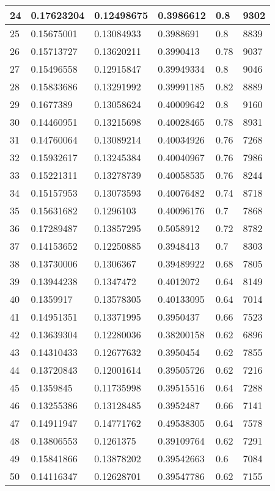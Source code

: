 \begin{longtable}{|l|l|l|l|l|l|}
24 & 0.17623204 & 0.12498675 & 0.3986612 & 0.8 & 9302 \\ \hline 
25 & 0.15675001 & 0.13084933 & 0.3988691 & 0.8 & 8839 \\ \hline 
26 & 0.15713727 & 0.13620211 & 0.3990413 & 0.78 & 9037 \\ \hline 
27 & 0.15496558 & 0.12915847 & 0.39949334 & 0.8 & 9046 \\ \hline 
28 & 0.15833686 & 0.13291992 & 0.39991185 & 0.82 & 8889 \\ \hline 
29 & 0.1677389 & 0.13058624 & 0.40009642 & 0.8 & 9160 \\ \hline 
30 & 0.14460951 & 0.13215698 & 0.40028465 & 0.78 & 8931 \\ \hline 
31 & 0.14760064 & 0.13089214 & 0.40034926 & 0.76 & 7268 \\ \hline 
32 & 0.15932617 & 0.13245384 & 0.40040967 & 0.76 & 7986 \\ \hline 
33 & 0.15221311 & 0.13278739 & 0.40058535 & 0.76 & 8244 \\ \hline 
34 & 0.15157953 & 0.13073593 & 0.40076482 & 0.74 & 8718 \\ \hline 
35 & 0.15631682 & 0.1296103 & 0.40096176 & 0.7 & 7868 \\ \hline 
36 & 0.17289487 & 0.13857295 & 0.5058912 & 0.72 & 8782 \\ \hline 
37 & 0.14153652 & 0.12250885 & 0.3948413 & 0.7 & 8303 \\ \hline 
38 & 0.13730006 & 0.1306367 & 0.39489922 & 0.68 & 7805 \\ \hline 
39 & 0.13944238 & 0.1347472 & 0.4012072 & 0.64 & 8149 \\ \hline 
40 & 0.1359917 & 0.13578305 & 0.40133095 & 0.64 & 7014 \\ \hline 
41 & 0.14951351 & 0.13371995 & 0.3950437 & 0.66 & 7523 \\ \hline 
42 & 0.13639304 & 0.12280036 & 0.38200158 & 0.62 & 6896 \\ \hline 
43 & 0.14310433 & 0.12677632 & 0.3950454 & 0.62 & 7855 \\ \hline 
44 & 0.13720843 & 0.12001614 & 0.39505726 & 0.62 & 7216 \\ \hline 
45 & 0.1359845 & 0.11735998 & 0.39515516 & 0.64 & 7288 \\ \hline 
46 & 0.13255386 & 0.13128485 & 0.3952487 & 0.66 & 7141 \\ \hline 
47 & 0.14911947 & 0.14771762 & 0.49538305 & 0.64 & 7578 \\ \hline 
48 & 0.13806553 & 0.1261375 & 0.39109764 & 0.62 & 7291 \\ \hline 
49 & 0.15841866 & 0.13878202 & 0.39542663 & 0.6 & 7084 \\ \hline 
50 & 0.14116347 & 0.12628701 & 0.39547786 & 0.62 & 7155 \\ \hline 
\end{longtable}